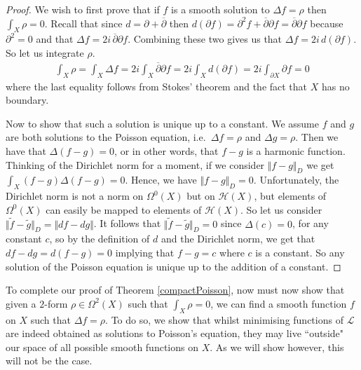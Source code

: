 \documentclass[11pt]{report}
\theoremstyle{definition}
\begin{document}
\begin{proof}
  We wish to first prove that if $f$ is a smooth solution to $\Delta f = \rho$ then $\int_X \rho = 0$. Recall that since $d = \partial + \overline{\partial}$ then $d(\partial f) = \partial^2 f + \overline{\partial}\partial f = \overline{\partial}\partial f$ because $\partial^2 = 0$ and that $\Delta f = 2i \, \overline{\partial}\partial f$. Combining these two gives us that $\Delta f =2i\,d(\partial f)$. So let us integrate $\rho$.
  \begin{align*}
    \int_X \rho = \int_X \Delta f = 2i \int_X \overline{\partial}\partial f = 2i \int_X d(\partial f) = 2i\int_{\partial X}\partial f = 0
  \end{align*}
  where the last equality follows from Stokes' theorem and the fact that $X$ has no boundary. 

  Now to show that such a solution is unique up to a constant. We assume $f$ and $g$ are both solutions to the Poisson equation, i.e.\ $\Delta f = \rho$ and $\Delta g = \rho$. Then we have that $\Delta (f - g) = 0$, or in other words, that $f-g$ is a harmonic function. Thinking of the Dirichlet norm for a moment, if we consider $\Vert f-g\Vert _D$ we get $\int_X (f-g)\Delta(f-g) = 0$. Hence, we have $\Vert f-g\Vert _D = 0$. Unfortunately, the Dirichlet norm is not a norm on $\Omega^0(X)$ but on $\mathcal{H}(X)$, but elements of $\Omega^0(X)$ can easily be mapped to elements of $\mathcal{H}(X)$. So let us consider $\Vert \tilde{f}-\tilde{g}\Vert _D = \Vert df - dg\Vert $. It follows that $\Vert \tilde{f}- \tilde{g}\Vert _D = 0$ since $\Delta(c) = 0$, for any constant $c$, so by the definition of $d$ and the Dirichlet norm, we get that $ df - dg = d(f-g) = 0$ implying that $f - g = c$ where $c$ is a constant. So any solution of the Poisson equation is unique up to the addition of a constant.
\end{proof} 

To complete our proof of Theorem \ref{compactPoisson}, now must now show that given a $2$-form $\rho \in \Omega^2(X)$ such that $\int_X \rho = 0$, we can find a smooth function $f$ on $X$ such that $\Delta f = \rho$. To do so, we show that whilst minimising functions of $\mathcal{L}$ are indeed obtained as solutions to Poisson's equation, they may live ``outside" our space of all possible smooth functions on $X$. As we will show however, this will not be the case.
\end{document}
